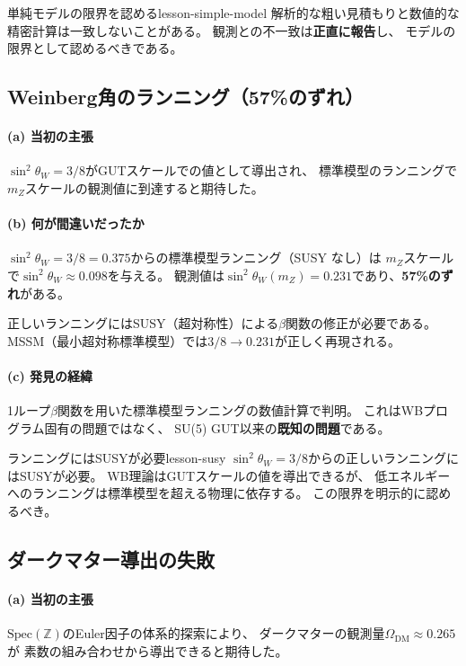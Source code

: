 \documentclass[11pt,a4paper]{article}
\newcommand{\Spec}{\mathrm{Spec}}
\begin{document}
\begin{keylesson}{単純モデルの限界を認める}{lesson-simple-model}
解析的な粗い見積もりと数値的な精密計算は一致しないことがある。
観測との不一致は\textbf{正直に報告}し、
モデルの限界として認めるべきである。
\end{keylesson}


\subsection{Weinberg角のランニング（57\%のずれ）}
\label{sec:15.5}

\paragraph{(a) 当初の主張}
$\sin^2\theta_W = 3/8$がGUTスケールでの値として導出され、
標準模型のランニングで$m_Z$スケールの観測値に到達すると期待した。

\paragraph{(b) 何が間違いだったか}
$\sin^2\theta_W = 3/8 = 0.375$からの標準模型ランニング（SUSY なし）は
$m_Z$スケールで$\sin^2\theta_W \approx 0.098$を与える。
観測値は$\sin^2\theta_W(m_Z) = 0.231$であり、\textbf{57\%のずれ}がある。

正しいランニングにはSUSY（超対称性）による$\beta$関数の修正が必要である。
MSSM（最小超対称標準模型）では$3/8 \to 0.231$が正しく再現される。

\paragraph{(c) 発見の経緯}
1ループ$\beta$関数を用いた標準模型ランニングの数値計算で判明。
これはWBプログラム固有の問題ではなく、
SU(5) GUT以来の\textbf{既知の問題}である。

\begin{keylesson}{ランニングにはSUSYが必要}{lesson-susy}
$\sin^2\theta_W = 3/8$からの正しいランニングにはSUSYが必要。
WB理論はGUTスケールの値を導出できるが、
低エネルギーへのランニングは標準模型を超える物理に依存する。
この限界を明示的に認めるべき。
\end{keylesson}


\subsection{ダークマター導出の失敗}
\label{sec:15.6}

\paragraph{(a) 当初の主張}
$\Spec(\mathbb{Z})$のEuler因子の体系的探索により、
ダークマターの観測量$\Omega_{\mathrm{DM}} \approx 0.265$が
素数の組み合わせから導出できると期待した。
\end{document}
